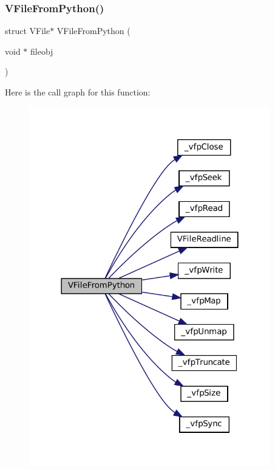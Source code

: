 \subsubsection{\texorpdfstring{V\+File\+From\+Python()}{VFileFromPython()}}
{\footnotesize\ttfamily struct V\+File$\ast$ V\+File\+From\+Python (\begin{DoxyParamCaption}\item[{void $\ast$}]{fileobj }\end{DoxyParamCaption})}

Here is the call graph for this function\+:
\nopagebreak
\begin{figure}[H]
\begin{center}
\leavevmode
\includegraphics[width=298pt]{vfs-py_8h_a2c8828e68e769f2b3de7641e6d12feea_cgraph}
\end{center}
\end{figure}
